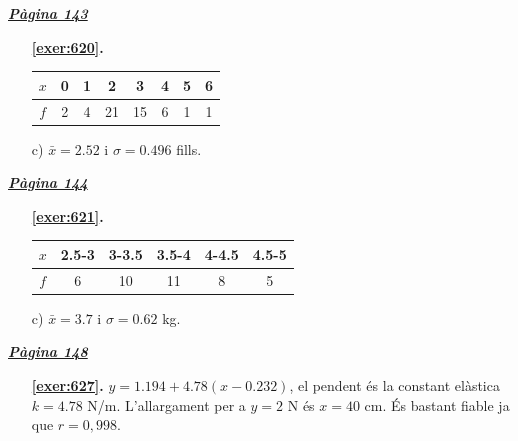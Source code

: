  \vspace{1cm} 
 

\vspace{0.3cm}


\hyperlink{page.143}{\textbf{\em Pàgina 143}}
\begin{enumerate}
\item[\fontfamily{phv}\selectfont\color{blue}\textbf{\ref{exer:620}. }] \label{ans:620} 
\begin {tabular}{c|c|c|c|c|c|c|c}\hline $x$ & 0 & 1 & 2 & 3 & 4 & 5 & 6 \\\hline $f$ & 2 &4 & 21 & 15 & 6 & 1 &1 \\ \end {tabular} \par c) $\bar x =2.52$ i $\sigma =0.496$ fills. 
 \end{enumerate}
\vspace{0.3cm}


\hyperlink{page.144}{\textbf{\em Pàgina 144}}
\begin{enumerate}
\item[\fontfamily{phv}\selectfont\color{blue}\textbf{\ref{exer:621}. }] \label{ans:621} 
\begin {tabular}{c|c|c|c|c|c}\hline $x$ & 2.5-3 & 3-3.5 & 3.5-4 & 4-4.5 & 4.5-5\\\hline $f$ & 6 & 10 & 11 & 8 & 5 \\ \end {tabular} \par c) $\bar x =3.7$ i $\sigma =0.62$ kg. 
 \end{enumerate}
\vspace{0.3cm}


\hyperlink{page.148}{\textbf{\em Pàgina 148}}
\begin{enumerate}
\item[\fontfamily{phv}\selectfont\color{blue}\textbf{\ref{exer:627}. }] \label{ans:627} 
$y=1.194+4.78(x-0.232)$, el pendent és la constant elàstica $k=4.78$ N/m. L'allargament per a $y=2$ N és $x=40$ cm. És bastant fiable ja que $r=0,998$.
 \end{enumerate}
\vspace{0.3cm}

